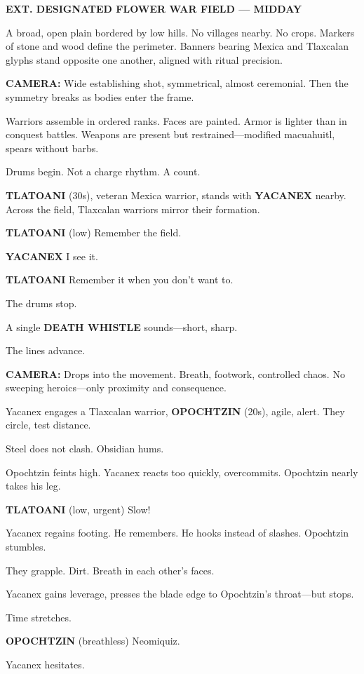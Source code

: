 \documentclass[12pt]{article}
\begin{document}
\textbf{EXT. DESIGNATED FLOWER WAR FIELD — MIDDAY}

A broad, open plain bordered by low hills. No villages nearby. No crops. Markers of stone and wood define the perimeter. Banners bearing Mexica and Tlaxcalan glyphs stand opposite one another, aligned with ritual precision.

\textbf{CAMERA:} Wide establishing shot, symmetrical, almost ceremonial. Then the symmetry breaks as bodies enter the frame.

Warriors assemble in ordered ranks. Faces are painted. Armor is lighter than in conquest battles. Weapons are present but restrained—modified macuahuitl, spears without barbs.

Drums begin. Not a charge rhythm. A count.

\textbf{TLATOANI} (30s), veteran Mexica warrior, stands with \textbf{YACANEX} nearby. Across the field, Tlaxcalan warriors mirror their formation.

\textbf{TLATOANI}  
(low)  
Remember the field.

\textbf{YACANEX}  
I see it.

\textbf{TLATOANI}  
Remember it when you don’t want to.

The drums stop.

A single \textbf{DEATH WHISTLE} sounds—short, sharp.

The lines advance.

\textbf{CAMERA:} Drops into the movement. Breath, footwork, controlled chaos. No sweeping heroics—only proximity and consequence.

Yacanex engages a Tlaxcalan warrior, \textbf{OPOCHTZIN} (20s), agile, alert. They circle, test distance.

Steel does not clash. Obsidian hums.

Opochtzin feints high. Yacanex reacts too quickly, overcommits. Opochtzin nearly takes his leg.

\textbf{TLATOANI}  
(low, urgent)  
Slow!

Yacanex regains footing. He remembers. He hooks instead of slashes. Opochtzin stumbles.

They grapple. Dirt. Breath in each other’s faces.

Yacanex gains leverage, presses the blade edge to Opochtzin’s throat—but stops.

Time stretches.

\textbf{OPOCHTZIN}  
(breathless)  
Neomiquiz.

Yacanex hesitates.
\end{document}
